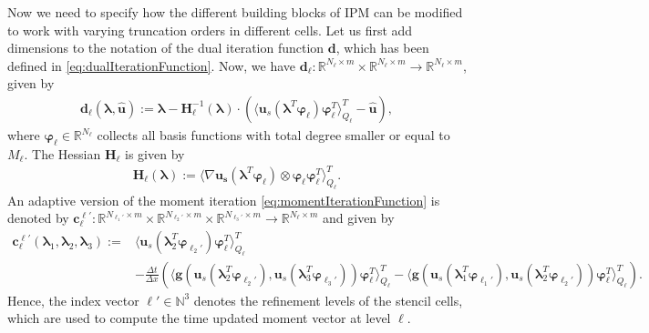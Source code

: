 Now we need to specify how the different building blocks of IPM can be modified to work with varying truncation orders in different cells. Let us first add dimensions to the notation of the dual iteration function $\bm d$, which has been defined in \eqref{eq:dualIterationFunction}. Now, we have 
$\bm{d}_{\ell}:\mathbb{R}^{N_{\ell}\times m}\times\mathbb{R}^{N_{\ell}\times m}\to\mathbb{R}^{N_{\ell}\times m}$, given by
\begin{align}\label{eq:dualIterationFunctionAd}
\bm{d}_{\ell}(\bm{\lambda},\bm{\hat{u}}):= \bm{\lambda}-\bm{H}_{\ell}^{-1}(\bm{\lambda})\cdot \left(\langle \bm u_{s}(\bm{\lambda}^T\bm{\varphi}_{\ell})\bm{\varphi}_{\ell}^T\rangle_{Q_{\ell}}^T-\bm{\hat{u}}\right),
\end{align}
where $\bm{\varphi}_{\ell}\in\mathbb{R}^{N_{\ell}}$ collects all basis functions with total degree smaller or equal to $M_\ell$. The Hessian $\bm{H}_{\ell}$ is given by 
\begin{align*}
\bm{H}_{\ell}(\bm{\lambda}) := \langle \nabla \bm{u}_{\bm{s}} (\bm{\lambda}^T\bm{\varphi}_{\ell})\otimes\bm{\varphi}_{\ell}\bm{\varphi}_{\ell}^T\rangle_{Q_{\ell}}^{T}.
\end{align*}
An adaptive version of the moment iteration \eqref{eq:momentIterationFunction} is denoted by $\bm c_{\ell}^{\bm{\ell}'}:\mathbb{R}^{N_{\ell_1'}\times m}\times \mathbb{R}^{N_{\ell_2'}\times m}\times \mathbb{R}^{N_{\ell_3'}\times m}\rightarrow \mathbb{R}^{N_{\ell}\times m}$ and given by
\begin{align}\label{eq:adaptiveFVUpdate}
\bm{c}_{\ell}^{\bm{\ell}'}\left(\bm{\lambda}_{1},\bm{\lambda}_2,\bm{\lambda}_3\right):= &\langle \bm u_{s}(\bm{\lambda}_2^T\bm{\varphi}_{\ell_2'})\bm{\varphi}_{\ell}^T\rangle_{Q_{\ell}}^T \\&- \frac{\Delta t}{\Delta x}\left(\langle \bm g(\bm u_{s}(\bm{\lambda}_2^T\bm{\varphi}_{\ell_2'}),\bm u_{s}(\bm{\lambda}_3^T\bm{\varphi}_{\ell_3'}))\bm{\varphi}_{\ell}^T\rangle_{Q_{\ell}}^T-\langle \bm g(\bm u_{s}(\bm{\lambda}_{1}^T\bm{\varphi}_{\ell_1'}),\bm u_{s}(\bm{\lambda}_2^T\bm{\varphi}_{\ell_2'}))\bm{\varphi}_{\ell}^T\rangle_{Q_{\ell}}^T\right). \nonumber
\end{align}
Hence, the index vector $\bm\ell'\in\mathbb{N}^{3}$ denotes the refinement levels of the stencil cells, which are used to compute the time updated moment vector at level $\ell$.

